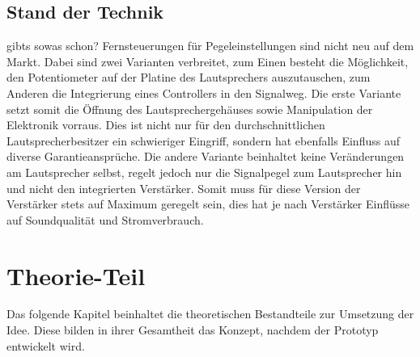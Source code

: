 \documentclass[11pt, titlepage, fleqn]{report}
\begin{document}
	\section{Stand der Technik}	
		gibts sowas schon?\newline
		Fernsteuerungen für Pegeleinstellungen sind nicht neu auf dem Markt. Dabei sind zwei Varianten verbreitet, zum Einen besteht die Möglichkeit,
		den Potentiometer auf der Platine des Lautsprechers auszutauschen, zum Anderen die Integrierung eines Controllers in den Signalweg.
		Die erste Variante setzt somit die Öffnung des Lautsprechergehäuses sowie Manipulation der Elektronik vorraus. Dies ist nicht nur für den durchschnittlichen
		Lautsprecherbesitzer ein schwieriger Eingriff, sondern hat ebenfalls Einfluss auf diverse Garantieansprüche.\newline
		Die andere Variante beinhaltet keine Veränderungen am Lautsprecher selbst, regelt jedoch nur die Signalpegel zum Lautsprecher hin und nicht den 
		integrierten Verstärker. Somit muss für diese Version der Verstärker stets auf Maximum geregelt sein, dies hat je nach Verstärker Einflüsse
		auf Soundqualität und Stromverbrauch.
	\chapter{Theorie-Teil}
		Das folgende Kapitel beinhaltet die theoretischen Bestandteile zur Umsetzung der Idee. Diese bilden in ihrer Gesamtheit das Konzept,
		nachdem der Prototyp entwickelt wird.
\end{document}
